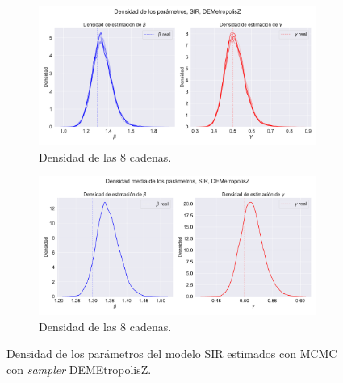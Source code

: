 \begin{figure}[h]
    \centering
    \begin{subfigure}[b]{\linewidth}
        \centering
        \includegraphics[width=0.7\linewidth]{img/content/chapter4/DEMetropolis_sir_params_density.pdf}
        \caption{Densidad de las 8 cadenas.}
    \end{subfigure}
     \begin{subfigure}[b]{\linewidth}
        \centering
        \includegraphics[width=0.7\linewidth]{img/content/chapter4/DEMetropolis_sir_params_density_mean.pdf}
        \caption{Densidad de las 8 cadenas.}
    \end{subfigure}
    \caption{Densidad de los parámetros del modelo SIR estimados con MCMC con \textit{sampler} DEMEtropolisZ.}
\end{figure}

